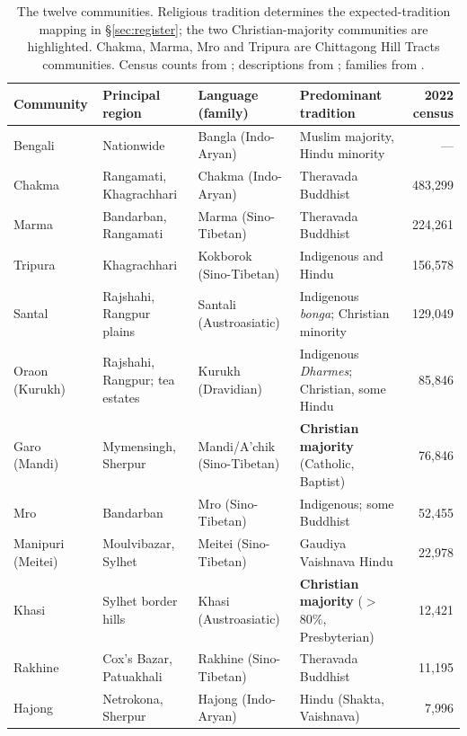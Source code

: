 \documentclass[11pt]{article}
\begin{document}
\begin{table}[t]
\centering\footnotesize
\setlength{\tabcolsep}{4pt}
\begin{tabular}{@{}p{2.0cm}p{3.5cm}p{3.3cm}p{4.4cm}r@{}}
\toprule
Community & Principal region & Language (family) & Predominant tradition & 2022 census \\
\midrule
Bengali           & Nationwide                      & Bangla (Indo-Aryan)         & Muslim majority, Hindu minority & --- \\
Chakma            & Rangamati, Khagrachhari         & Chakma (Indo-Aryan)         & Theravada Buddhist              & 483{,}299 \\
Marma             & Bandarban, Rangamati            & Marma (Sino-Tibetan)        & Theravada Buddhist              & 224{,}261 \\
Tripura           & Khagrachhari                    & Kokborok (Sino-Tibetan)     & Indigenous and Hindu            & 156{,}578 \\
Santal            & Rajshahi, Rangpur plains        & Santali (Austroasiatic)     & Indigenous \textit{bonga}; Christian minority & 129{,}049 \\
Oraon (Kurukh)    & Rajshahi, Rangpur; tea estates  & Kurukh (Dravidian)          & Indigenous \textit{Dharmes}; Christian, some Hindu & 85{,}846 \\
Garo (Mandi)      & Mymensingh, Sherpur             & Mandi/A'chik (Sino-Tibetan) & \textbf{Christian majority} (Catholic, Baptist) & 76{,}846 \\
Mro               & Bandarban                       & Mro (Sino-Tibetan)          & Indigenous; some Buddhist       & 52{,}455 \\
Manipuri (Meitei) & Moulvibazar, Sylhet             & Meitei (Sino-Tibetan)       & Gaudiya Vaishnava Hindu         & 22{,}978 \\
Khasi             & Sylhet border hills             & Khasi (Austroasiatic)       & \textbf{Christian majority} ($>$80\%, Presbyterian) & 12{,}421 \\
Rakhine           & Cox's Bazar, Patuakhali         & Rakhine (Sino-Tibetan)      & Theravada Buddhist              & 11{,}195 \\
Hajong            & Netrokona, Sherpur              & Hajong (Indo-Aryan)         & Hindu (Shakta, Vaishnava)       & 7{,}996 \\
\bottomrule
\end{tabular}
\caption{The twelve communities. Religious tradition determines the
expected-tradition mapping in \S\ref{sec:register}; the two Christian-majority
communities are highlighted. Chakma, Marma, Mro and Tripura are Chittagong
Hill Tracts communities. Census counts from \citet{bbs2022census};
descriptions from \citet{banglapedia}; families from \citet{glottolog}.}
\label{tab:cultures}
\end{table}
\end{document}
